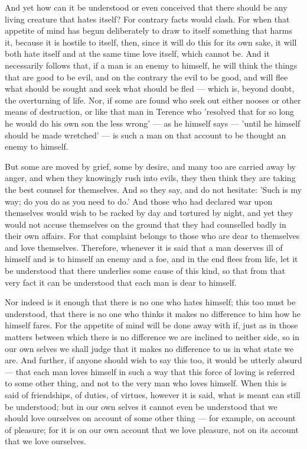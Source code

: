  And yet how can it be understood or even conceived that there should be any living creature that hates itself? For contrary facts would clash. For when that appetite of mind has begun deliberately to draw to itself something that harms it, because it is hostile to itself, then, since it will do this for its own sake, it will both hate itself and at the same time love itself, which cannot be. And it necessarily follows that, if a man is an enemy to himself, he will think the things that are good to be evil, and on the contrary the evil to be good, and will flee what should be sought and seek what should be fled — which is, beyond doubt, the overturning of life. Nor, if some are found who seek out either nooses or other means of destruction, or like that man in Terence who 'resolved that for so long he would do his own son the less wrong' — as he himself says — 'until he himself should be made wretched' — is such a man on that account to be thought an enemy to himself.

 But some are moved by grief, some by desire, and many too are carried away by anger, and when they knowingly rush into evils, they then think they are taking the best counsel for themselves. And so they say, and do not hesitate: 'Such is my way; do you do as you need to do.' And those who had declared war upon themselves would wish to be racked by day and tortured by night, and yet they would not accuse themselves on the ground that they had counselled badly in their own affairs. For that complaint belongs to those who are dear to themselves and love themselves. Therefore, whenever it is said that a man deserves ill of himself and is to himself an enemy and a foe, and in the end flees from life, let it be understood that there underlies some cause of this kind, so that from that very fact it can be understood that each man is dear to himself.

 Nor indeed is it enough that there is no one who hates himself; this too must be understood, that there is no one who thinks it makes no difference to him how he himself fares. For the appetite of mind will be done away with if, just as in those matters between which there is no difference we are inclined to neither side, so in our own selves we shall judge that it makes no difference to us in what state we are. And further, if anyone should wish to say this too, it would be utterly absurd — that each man loves himself in such a way that this force of loving is referred to some other thing, and not to the very man who loves himself. When this is said of friendships, of duties, of virtues, however it is said, what is meant can still be understood; but in our own selves it cannot even be understood that we should love ourselves on account of some other thing — for example, on account of pleasure; for it is on our own account that we love pleasure, not on its account that we love ourselves.

